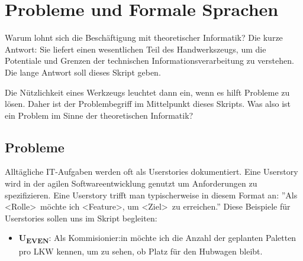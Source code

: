 \chapter{Probleme und Formale Sprachen}\label{einleitung}
Warum lohnt sich die Beschäftigung mit theoretischer Informatik?
Die kurze Antwort: Sie liefert einen wesentlichen Teil des Handwerkszeugs,
um die Potentiale und Grenzen der technischen Informationsverarbeitung zu verstehen.
Die lange Antwort soll dieses Skript geben.

Die Nützlichkeit eines Werkzeugs leuchtet dann ein,
wenn es hilft Probleme zu lösen.
Daher ist der Problembegriff im Mittelpunkt dieses Skripts.
Was also ist ein Problem im Sinne der theoretischen Informatik?

\section{Probleme}

Alltägliche IT-Aufgaben werden oft als Userstories dokumentiert.
Eine Userstory wird in der agilen Softwareentwicklung genutzt um Anforderungen zu spezifizieren.
Eine Userstory trifft man typischerweise in diesem Format an:
''Als \textless Rolle\textgreater\ möchte ich \textless Feature\textgreater,
um \textless Ziel\textgreater\ zu erreichen.''
Diese Beispiele für Userstories sollen uns im Skript begleiten:

\begin{itemize}
    \item \textbf{U\textsubscript{EVEN}}: Als Kommisionier:in
         möchte ich die Anzahl der geplanten Paletten pro LKW kennen,
         um zu sehen, ob Platz für den Hubwagen bleibt. 
\end{itemize}

